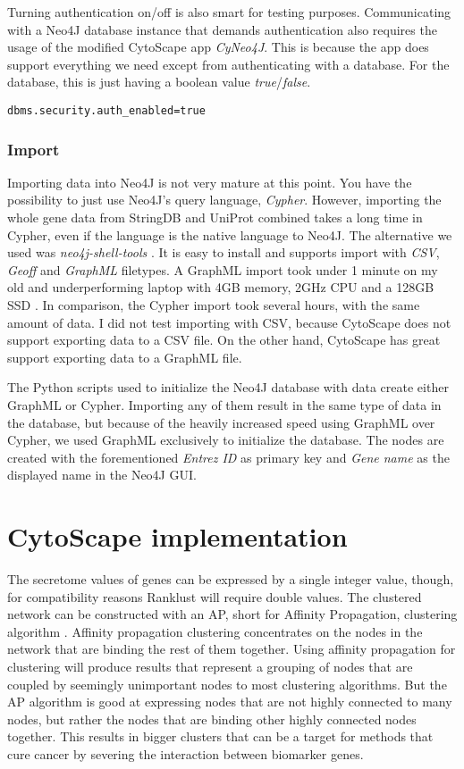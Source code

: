 Turning authentication on/off is also smart for testing purposes. Communicating
with a Neo4J database instance that demands authentication also requires the
usage of the modified CytoScape app \textit{CyNeo4J}. This is because the app
does support everything we need except from authenticating with a database. For
the database, this is just having a boolean value \textit{true}/\textit{false}.

\begin{verbatim}
dbms.security.auth_enabled=true
\end{verbatim}

\subsection{Import}
Importing data into Neo4J is not very mature at this point. You have the
possibility to just use Neo4J's query language, \textit{Cypher}. However,
importing the whole gene data from StringDB and UniProt combined takes a long
time in Cypher, even if the language is the native language to Neo4J. The
alternative we used was \textit{neo4j-shell-tools} \cite{neo4j-tools}. It is
easy to install and supports import with \textit{CSV}, \textit{Geoff} and
\textit{GraphML} filetypes. A GraphML import took under 1 minute on my old and
underperforming laptop with 4GB memory, 2GHz CPU and a 128GB SSD \cite{laptop}.
In comparison, the Cypher import took several hours, with the same amount of
data. I did not test importing with CSV, because CytoScape does not support
exporting data to a CSV file. On the other hand, CytoScape has great support
exporting data to a GraphML file.

The Python scripts used to initialize the Neo4J database with data create either
GraphML or Cypher. Importing any of them result in the same type of data in the
database, but because of the heavily increased speed using GraphML over Cypher,
we used GraphML exclusively to initialize the database. The nodes are created
with the forementioned \textit{Entrez ID} as primary key and \textit{Gene name}
as the displayed name in the Neo4J GUI.

\chapter{CytoScape implementation}
The secretome values of genes can be expressed by a single integer value,
though, for compatibility reasons Ranklust will require double values. The
clustered network can be constructed with an AP, short for Affinity Propagation,
clustering algorithm \cite{affinity-propagation}. Affinity propagation
clustering concentrates on the nodes in the network that are binding the rest of
them together. Using affinity propagation for clustering will produce results
that represent a grouping of nodes that are coupled by seemingly unimportant
nodes to most clustering algorithms. But the AP algorithm is good at expressing
nodes that are not highly connected to many nodes, but rather the nodes that are
binding other highly connected nodes together. This results in bigger clusters
that can be a target for methods that cure cancer by severing the interaction
between biomarker genes.

